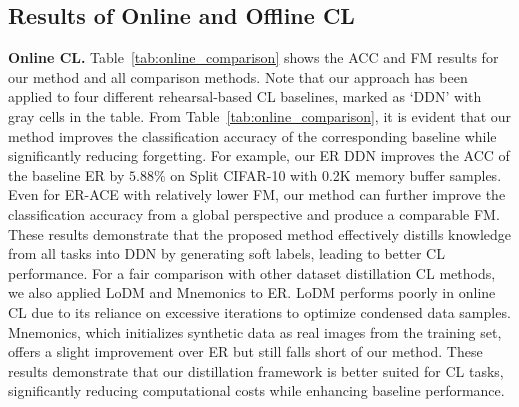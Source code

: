\documentclass[table, xcdraw]{article}
\theoremstyle{plain}
\theoremstyle{definition}
\theoremstyle{remark}
\begin{document}
\vspace{-2mm}
\subsection{Results of Online and Offline CL}
\textbf{Online CL.} Table~\ref{tab:online_comparison} shows the ACC and FM results for our method and all comparison methods. Note that our approach has been applied to four different rehearsal-based CL baselines, marked as `DDN' with gray cells in the table. From Table~\ref{tab:online_comparison}, it is evident that our method improves the classification accuracy of the corresponding baseline while significantly reducing forgetting. For example, our ER DDN improves the ACC of the baseline ER by $5.88\%$ on Split CIFAR-10 with 0.2K memory buffer samples. Even for ER-ACE with relatively lower FM, our method can further improve the classification accuracy from a global perspective and produce a comparable FM. These results demonstrate that the proposed method effectively distills knowledge from all tasks into DDN by generating soft labels, leading to better CL performance.
For a fair comparison with other dataset distillation CL methods, we also applied LoDM and Mnemonics to ER. LoDM performs poorly in online CL due to its reliance on excessive iterations to optimize condensed data samples. Mnemonics, which initializes synthetic data as real images from the training set, offers a slight improvement over ER but still falls short of our method. These results demonstrate that our distillation framework is better suited for CL tasks, significantly reducing computational costs while enhancing baseline performance.
\end{document}
